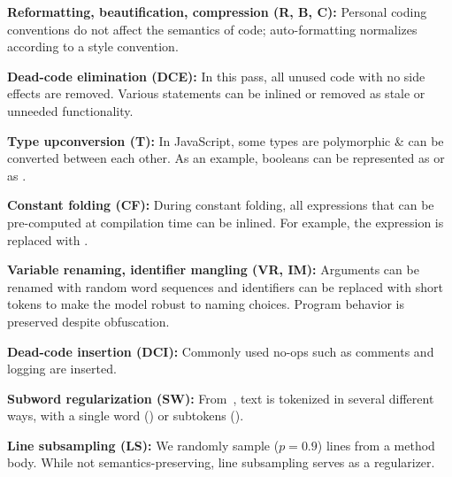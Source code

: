 \documentclass[11pt]{article}
\begin{document}
\textbf{Reformatting, beautification, compression (R, B, C):}
Personal coding conventions do not affect the semantics of code; auto-formatting normalizes according to a style convention.

\textbf{Dead-code elimination (DCE):}
In this pass, all unused code with no side effects are removed. Various statements can be inlined or removed as stale or unneeded functionality.

\textbf{Type upconversion (T):}
In JavaScript, some types are polymorphic \& can be converted between each other. As an example, booleans can be represented as  or as .

\textbf{Constant folding (CF):}
During constant folding, all expressions that can be pre-computed at compilation time can be inlined. For example, the expression  is replaced with .

\textbf{Variable renaming, identifier mangling (VR, IM):}
Arguments can be renamed with random word sequences and identifiers can be replaced with short tokens to make the model robust to naming choices. Program behavior is preserved despite obfuscation.

\textbf{Dead-code insertion (DCI):}
Commonly used no-ops such as comments and logging are inserted.

\textbf{Subword regularization (SW):}
From~\citet{kudo2018subword}, text is tokenized in several different ways, with a single word () or subtokens ().

\textbf{Line subsampling (LS):}
We randomly sample ($p = 0.9$) lines from a method body. While not semantics-preserving, line subsampling serves as a regularizer.
\end{document}
